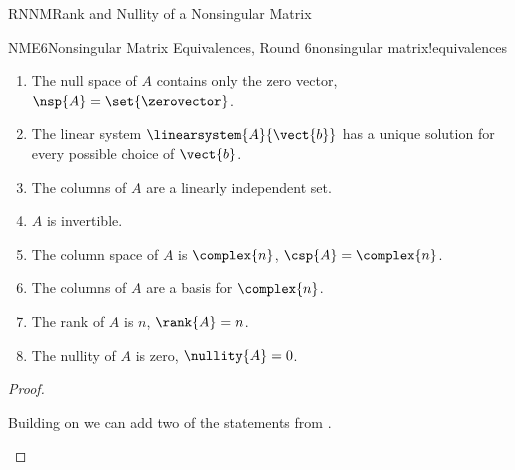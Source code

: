 \begin{subsect}{RNNM}{Rank and Nullity of a Nonsingular Matrix}
\begin{theorem}{NME6}{Nonsingular Matrix Equivalences, Round 6}{nonsingular matrix!equivalences}
\begin{para}
\begin{enumerate}
\item The null space of $A$ contains only the zero vector, $\nsp{A}=\set{\zerovector}$.
\item The linear system $\linearsystem{A}{\vect{b}}$ has a unique solution for every possible choice of $\vect{b}$.
\item The columns of $A$ are a linearly independent set.
\item $A$ is invertible.
\item The column space of $A$ is $\complex{n}$, $\csp{A}=\complex{n}$.
\item The columns of $A$ are a basis for $\complex{n}$.
\item The rank of $A$ is $n$, $\rank{A}=n$.
\item The nullity of $A$ is zero, $\nullity{A}=0$.
\end{enumerate}
\end{para}
\end{theorem}
%
\begin{proof}
\begin{para}Building on  we can add two of the statements from .\end{para}
\end{proof}
%
%
\end{subsect}
%

